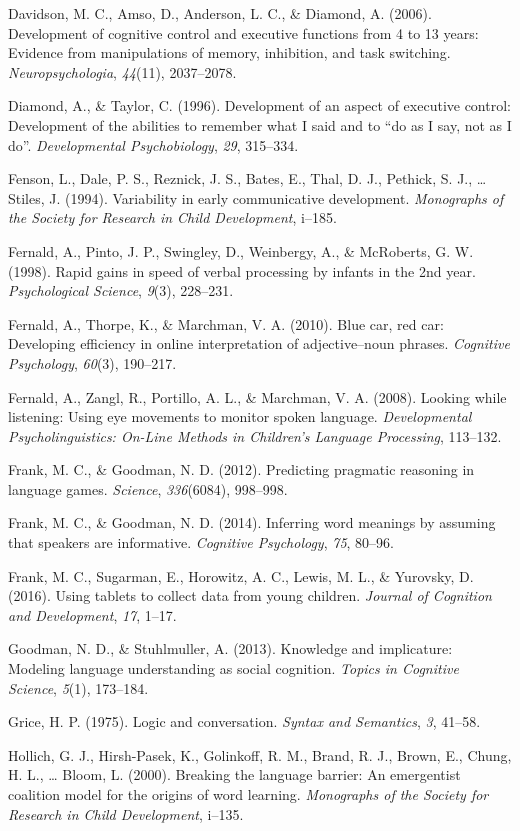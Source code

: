 \documentclass[a4paper,man,apacite,floatsintext]{apa6}
\begin{document}
Davidson, M. C., Amso, D., Anderson, L. C., \& Diamond, A. (2006).
Development of cognitive control and executive functions from 4 to 13
years: Evidence from manipulations of memory, inhibition, and task
switching. \emph{Neuropsychologia}, \emph{44}(11), 2037--2078.

Diamond, A., \& Taylor, C. (1996). Development of an aspect of executive
control: Development of the abilities to remember what I said and to
``do as I say, not as I do''. \emph{Developmental Psychobiology},
\emph{29}, 315--334.

Fenson, L., Dale, P. S., Reznick, J. S., Bates, E., Thal, D. J.,
Pethick, S. J., \ldots{} Stiles, J. (1994). Variability in early
communicative development. \emph{Monographs of the Society for Research
in Child Development}, i--185.

Fernald, A., Pinto, J. P., Swingley, D., Weinbergy, A., \& McRoberts, G.
W. (1998). Rapid gains in speed of verbal processing by infants in the
2nd year. \emph{Psychological Science}, \emph{9}(3), 228--231.

Fernald, A., Thorpe, K., \& Marchman, V. A. (2010). Blue car, red car:
Developing efficiency in online interpretation of adjective--noun
phrases. \emph{Cognitive Psychology}, \emph{60}(3), 190--217.

Fernald, A., Zangl, R., Portillo, A. L., \& Marchman, V. A. (2008).
Looking while listening: Using eye movements to monitor spoken language.
\emph{Developmental Psycholinguistics: On-Line Methods in Children's
Language Processing}, 113--132.

Frank, M. C., \& Goodman, N. D. (2012). Predicting pragmatic reasoning
in language games. \emph{Science}, \emph{336}(6084), 998--998.

Frank, M. C., \& Goodman, N. D. (2014). Inferring word meanings by
assuming that speakers are informative. \emph{Cognitive Psychology},
\emph{75}, 80--96.

Frank, M. C., Sugarman, E., Horowitz, A. C., Lewis, M. L., \& Yurovsky,
D. (2016). Using tablets to collect data from young children.
\emph{Journal of Cognition and Development}, \emph{17}, 1--17.

Goodman, N. D., \& Stuhlmuller, A. (2013). Knowledge and implicature:
Modeling language understanding as social cognition. \emph{Topics in
Cognitive Science}, \emph{5}(1), 173--184.

Grice, H. P. (1975). Logic and conversation. \emph{Syntax and
Semantics}, \emph{3}, 41--58.

Hollich, G. J., Hirsh-Pasek, K., Golinkoff, R. M., Brand, R. J., Brown,
E., Chung, H. L., \ldots{} Bloom, L. (2000). Breaking the language
barrier: An emergentist coalition model for the origins of word
learning. \emph{Monographs of the Society for Research in Child
Development}, i--135.
\end{document}
